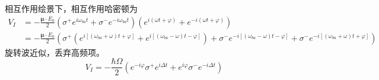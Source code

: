 \documentclass{article}
\begin{document}
相互作用绘景下，相互作用哈密顿为
\begin{equation*}
  \begin{split}
     V_I&=-\frac{\mathbf{\mu}\cdot E_0}{2}(\sigma^+e^{i\omega_{ba}t}+\sigma^-e^{-i\omega_{ba}t})(e^{i(\omega t+\varphi)}+e^{-i(\omega t+\varphi)})\\
       &=-\frac{\mathbf{\mu}\cdot E_0}{2}(\sigma^+(e^{i[(\omega_{ba}+\omega)t+\varphi]}+e^{i[(\omega_{ba}-\omega)t-\varphi]})+\sigma^-e^{-i[(\omega_{ba}-\omega)t-\varphi]}+\sigma^-e^{-i[(\omega_{ba}+\omega)t+\varphi]})
  \end{split}
\end{equation*}
旋转波近似，丢弃高频项。
\begin{equation*}
  V_I=-\frac{\hbar\Omega}{2}(e^{-i\varphi}\sigma^+e^{i\Delta t}+e^{i\varphi}\sigma^-e^{-i\Delta t})
\end{equation*}
\end{document}
